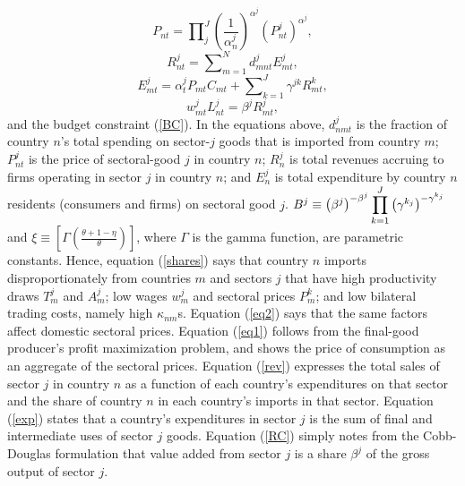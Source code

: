 \documentclass{article}
\begin{document}
\begin{equation}
P_{nt}=\prod\nolimits_{j}^{J}\left( \frac{1}{\alpha _{n}^{j}}\right)
^{\alpha ^{j}}\left( P_{nt}^{j}\right) ^{\alpha ^{j}},  \label{eq1}
\end{equation}%
\begin{equation}
R_{nt}^{j}=\sum\nolimits_{m=1}^{N}d_{mnt}^{j}E_{mt}^{j},  \label{rev}
\end{equation}%
\begin{equation}
E_{mt}^{j}=\alpha _{t}^{j}P_{mt}C_{mt}+\sum\nolimits_{k=1}^{J}\gamma
^{jk}R_{mt}^{k},  \label{exp}
\end{equation}%
\begin{equation}
w_{mt}^{j}L_{nt}^{j}=\beta ^{j}R_{mt}^{j},  \label{RC}
\end{equation}%
and the budget constraint (\ref{BC}). In the equations above, $d_{nmt}^{j}$
is the fraction of country $n$'s total spending on sector-$j$ goods that is
imported from country $m;$ $P_{nt}^{j}$ is the price of sectoral-good $j$ in
country $n$; $R_{n}^{j}$ is total revenues accruing to firms operating in
sector $j$ in country $n$; and $E_{n}^{j}$ is total expenditure by country $%
n $ residents (consumers and firms) on sectoral good $j$. $B^{j}\equiv
\left( \beta ^{j}\right) ^{-\beta ^{j}}\dprod\limits_{k=1}^{J}\left( \gamma
^{k_{j}}\right) ^{-\gamma ^{k_{j}}}$ and $\xi \equiv \left[ \Gamma \left( 
\frac{\theta +1-\eta }{\theta }\right) \right] $, where $\Gamma $ is the
gamma function, are parametric constants. Hence, equation (\ref{shares})
says that country $n$ imports disproportionately from countries $m$ and
sectors $j$ that have high productivity draws $T_{m}^{j}$ and $A_{m}^{j}$;
low wages $w_{m}^{j}$ and sectoral prices $P_{m}^{k}$; and low bilateral
trading costs, namely high $\kappa _{nm}$s. Equation (\ref{eq2}) says that
the same factors affect domestic sectoral prices. Equation (\ref{eq1})
follows from the final-good producer's profit maximization problem, and
shows the price of consumption as an aggregate of the sectoral prices.
Equation (\ref{rev}) expresses the total sales of sector $j$ in country $n$
as a function of each country's expenditures on that sector and the share of
country $n$ in each country's imports in that sector. Equation (\ref{exp})
states that a country's expenditures in sector $j$ is the sum of final and
intermediate uses of sector $j$ goods. Equation (\ref{RC}) simply notes from
the Cobb-Douglas formulation that value added from sector $j$ is a share $%
\beta ^{j}$ of the gross output of sector $j$.
\end{document}
